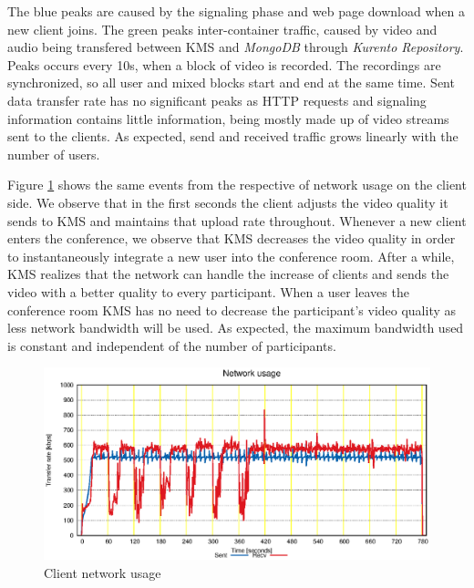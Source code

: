 \documentclass[10pt,conference]{IEEEtran}
\begin{document}
The blue peaks are caused by the signaling phase and web page download when a new client joins.
The green peaks inter-container traffic, caused by video and audio being transfered between \gls{KMS} and \emph{MongoDB} through \emph{Kurento Repository}.
Peaks occurs every 10s, when a block of video is recorded.
The recordings are synchronized, so all user and mixed blocks start and end at the same time.
Sent data transfer rate has no significant peaks as \gls{HTTP} requests and signaling information contains little information, being mostly made up of video streams sent to the clients.
As expected, send and received traffic grows linearly with the number of users.



Figure \ref{fig:test_client_net} shows the same events from the respective of network usage on the client side.
We observe that in the first seconds the client adjusts the video quality it sends to \gls{KMS} and maintains that upload rate throughout.
Whenever a new client enters the conference, we observe that \gls{KMS} decreases the video quality in order to instantaneously integrate a new user into the conference room.
After a while, \gls{KMS} realizes that the network can handle the increase of clients and sends the video with a better quality to every participant.
When a user leaves the conference room \gls{KMS} has no need to decrease the participant's video quality as less network bandwidth will be used.
As expected, the maximum bandwidth used is constant and independent of the number of participants.

\begin{figure}
  \centering
  \includegraphics[width=\linewidth]{stats/test_client_net.eps}
  \caption{Client network usage}
  \label{fig:test_client_net}
\end{figure}
\end{document}
